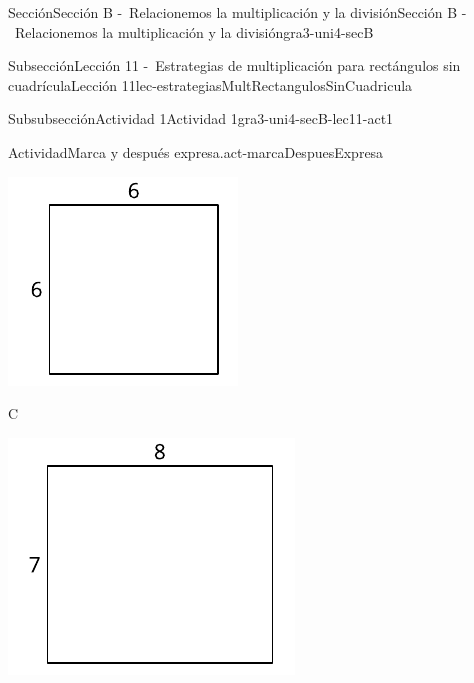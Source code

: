 \begin{sectionptx}{Sección}{Sección B -~Relacionemos la multiplicación y la división}{}{Sección B -~Relacionemos la multiplicación y la división}{}{}{gra3-uni4-secB}
\begin{subsectionptx}{Subsección}{Lección 11 -~Estrategias de multiplicación para rectángulos sin cuadrícula}{}{Lección 11}{}{}{lec-estrategiasMultRectangulosSinCuadricula}
\begin{subsubsectionptx}{Subsubsección}{Actividad 1}{}{Actividad 1}{}{}{gra3-uni4-secB-lec11-act1}
\begin{activity}{Actividad}{Marca y después expresa.}{act-marcaDespuesExpresa}
\begin{sidebyside}{3}{0}{0}{0}
\begin{sbspanel}{0.261}
\includegraphics[max width=\linewidth, center]{external/svg-source/tikz-file-153085.pdf}
\end{sbspanel}%
\begin{sbspanel}{0.348}%
C%
\par
\includegraphics[max width=\linewidth, center]{external/svg-source/tikz-file-153086.pdf}
\end{sbspanel}%
\end{sidebyside}%
\begin{image}{0}{1}{0}{}%

\end{image}
\end{activity}
\end{subsubsectionptx}
\end{subsectionptx}
\end{sectionptx}
